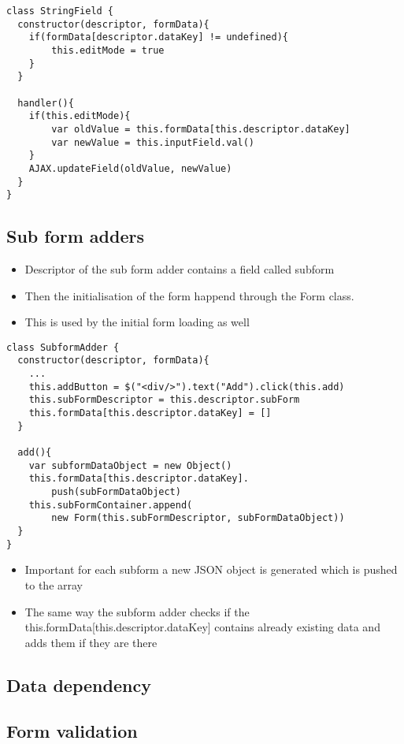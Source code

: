 \begin{lstlisting}[basicstyle=\footnotesize, frame=single, caption={Data saving}, captionpos=b]
class StringField {
  constructor(descriptor, formData){
    if(formData[descriptor.dataKey] != undefined){
    	this.editMode = true
    }
  }

  handler(){
    if(this.editMode){
    	var oldValue = this.formData[this.descriptor.dataKey]
		var newValue = this.inputField.val() 
    }
    AJAX.updateField(oldValue, newValue)
  }			
}
\end{lstlisting}


\subsection{Sub form adders}


\begin{itemize}
	\item Descriptor of the sub form adder contains a field called subform
	\item Then the initialisation of the form happend through the Form class.	
	\item This is used by the initial form loading as well
\end{itemize}

\begin{lstlisting}[basicstyle=\footnotesize, frame=single, caption={Sub form adder routine}, captionpos=b]
class SubformAdder {
  constructor(descriptor, formData){
    ...
    this.addButton = $("<div/>").text("Add").click(this.add)    
    this.subFormDescriptor = this.descriptor.subForm
    this.formData[this.descriptor.dataKey] = []
  }

  add(){
    var subformDataObject = new Object()
    this.formData[this.descriptor.dataKey].
  		push(subFormDataObject) 
    this.subFormContainer.append(
    	new Form(this.subFormDescriptor, subFormDataObject))
  }
}
\end{lstlisting}

\begin{itemize}
	\item Important for each subform a new JSON object is generated which is pushed to the array		
	\item The same way the subform adder checks if the this.formData[this.descriptor.dataKey] contains already existing data and adds them if they are there
\end{itemize}


\subsection{Data dependency}

\subsection{Form validation}

